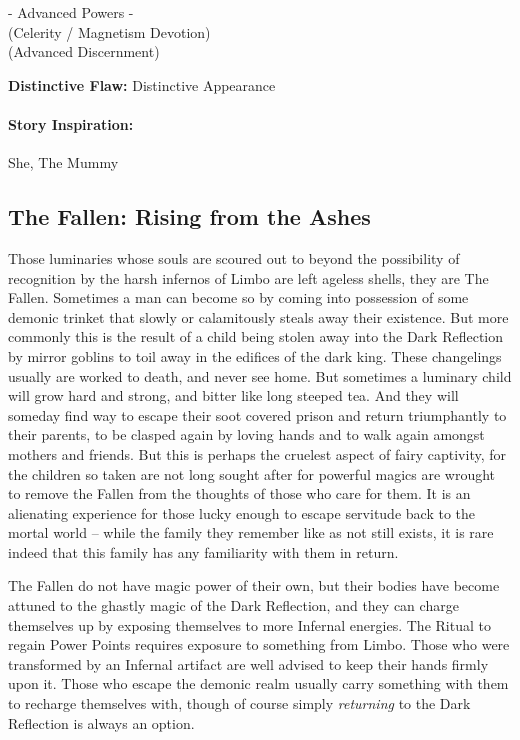 - Advanced Powers -\\
 (Celerity / Magnetism Devotion)\\
 (Advanced Discernment)

\textbf{Distinctive Flaw:} Distinctive Appearance

\paragraph{Story Inspiration:} She, The Mummy

\subsection[Fallen]{The Fallen: Rising from the Ashes} 

Those luminaries whose souls are scoured out to beyond the possibility of recognition by the harsh infernos of Limbo are left ageless shells, they are The Fallen. Sometimes a man can become so by coming into possession of some demonic trinket that slowly or calamitously steals away their existence. But more commonly this is the result of a child being stolen away into the Dark Reflection by mirror goblins to toil away in the edifices of the dark king. These changelings usually are worked to death, and never see home. But sometimes a luminary child will grow hard and strong, and bitter like long steeped tea. And they will someday find way to escape their soot covered prison and return triumphantly to their parents, to be clasped again by loving hands and to walk again amongst mothers and friends. But this is perhaps the cruelest aspect of fairy captivity, for the children so taken are not long sought after for powerful magics are wrought to remove the Fallen from the thoughts of those who care for them. It is an alienating experience for those lucky enough to escape servitude back to the mortal world -- while the family they remember like as not still exists, it is rare indeed that this family has any familiarity with them in return.

The Fallen do not have magic power of their own, but their bodies have become attuned to the ghastly magic of the Dark Reflection, and they can charge themselves up by exposing themselves to more Infernal energies. The Ritual to regain Power Points requires exposure to something from Limbo. Those who were transformed by an Infernal artifact are well advised to keep their hands firmly upon it. Those who escape the demonic realm usually carry something with them to recharge themselves with, though of course simply \textit{returning} to the Dark Reflection is always an option.

